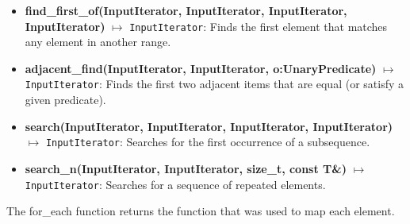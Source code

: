 \documentclass{report}
\begin{document}
\begin{itemize}
        \item \textbf{find\_first\_of(InputIterator, InputIterator, InputIterator, InputIterator)} \(\mapsto\) \texttt{InputIterator}: Finds the first element that matches any element in another range.
        \item \textbf{adjacent\_find(InputIterator, InputIterator, o:UnaryPredicate)} \(\mapsto\) \texttt{InputIterator}: Finds the first two adjacent items that are equal (or satisfy a given predicate).
        \item \textbf{search(InputIterator, InputIterator, InputIterator, InputIterator)} \(\mapsto\) \texttt{InputIterator}: Searches for the first occurrence of a subsequence.
        \item \textbf{search\_n(InputIterator, InputIterator, size\_t, const T\&)} \(\mapsto\) \texttt{InputIterator}: Searches for a sequence of repeated elements.
    \end{itemize}
    \bigbreak \noindent 
    \begin{notebox}
       The for\_each function returns the function that was used to map each element.
    \end{notebox}
\end{document}
